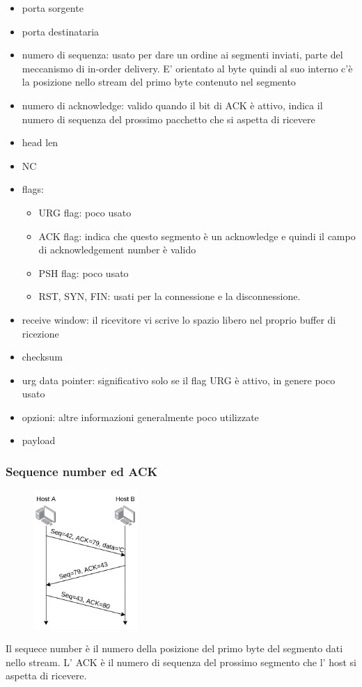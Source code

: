 \begin{itemize}
    \item porta sorgente
    \item porta destinataria
    \item numero di sequenza: usato per dare un ordine ai segmenti inviati, parte del meccanismo di in-order delivery.
    E' orientato al byte quindi al suo interno c'è la posizione nello stream del primo byte contenuto nel segmento
    \item numero di acknowledge: valido quando il bit di ACK è attivo, indica il numero di sequenza del prossimo pacchetto che si aspetta di ricevere
    \item head len
    \item NC
    \item flags:
    \begin{itemize}
        \item URG flag: poco usato
        \item ACK flag: indica che questo segmento è un acknowledge e quindi il campo di acknowledgement number è valido
        \item PSH flag: poco usato
        \item RST, SYN, FIN: usati per la connessione e la disconnessione.
    \end{itemize}
    \item receive window: il ricevitore vi scrive lo spazio libero nel proprio buffer di ricezione
    \item checksum
    \item urg data pointer: significativo solo se il flag URG è attivo, in genere poco usato
    \item opzioni: altre informazioni generalmente poco utilizzate
    \item payload
\end{itemize}

\subsubsection{Sequence number ed ACK}
\begin{figure}[H]
    \centering
    \includegraphics[width=150px]{images/6_Trasporto/sequence_number_ack.png}
\end{figure}
Il sequece number è il numero della posizione del primo byte del segmento dati nello stream.
L' ACK è il numero di sequenza del prossimo segmento che l' host si aspetta di ricevere.

